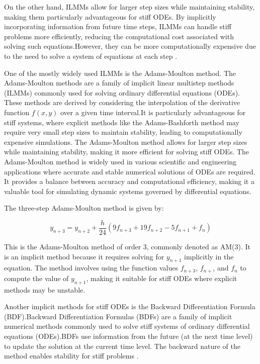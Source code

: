 On the other hand, ILMMs allow for larger step sizes while maintaining stability, making them particularly advantageous for stiff ODEs. By implicitly incorporating information from future time steps, ILMMs can handle stiff problems more efficiently, reducing the computational cost associated with solving such equations.However, they can be more computationally expensive due to the need to solve a system of equations at each step \cite{thohura2013numerical}.

One of the mostly widely used ILMMs is the Adams-Moulton method. The Adams-Moulton methods are a family of implicit linear multistep methods (ILMMs) commonly used for solving ordinary differential equations (ODEs). These methods are derived by considering the interpolation of the derivative function $f(x,y)$ over a given time interval.It is particularly advantageous for stiff systems, where explicit methods like the Adams-Bashforth method may require very small step sizes to maintain stability, leading to computationally expensive simulations. The Adams-Moulton method allows for larger step sizes while maintaining stability, making it more efficient for solving stiff ODEs.
The Adams-Moulton method is widely used in various scientific and engineering applications where accurate and stable numerical solutions of ODEs are required. It provides a balance between accuracy and computational efficiency, making it a valuable tool for simulating dynamic systems governed by differential equations.

The three-step Adams-Moulton method is given by:


\begin{equation}
  y_{n+3} = y_{n+2} + \frac{h}{24} \left( 9 f_{n+3} + 19 f_{n+2} - 5 f_{n+1} + f_{n} \right)
\end{equation}


This is the Adams-Moulton method of order 3, commonly denoted as AM(3). It is an implicit method because it requires solving for \( y_{n+1} \) implicitly in the equation. The method involves using the function values \( f_{n+3} \), \( f_{n+} \), and \( f_n \) to compute the value of \( y_{n+1} \), making it suitable for stiff ODEs where explicit methods may be unstable.


Another implicit methods for stiff ODEs is the Backward Differentiation Formula (BDF).Backward Differentiation Formulas (BDFs) are a family of implicit numerical methods commonly used to solve stiff systems of ordinary differential equations (ODEs).BDFs use information from the future (at the next time level) to update the solution at the current time level. The backward nature of the method enables stability for stiff problems \cite{numericalrecipes}.

